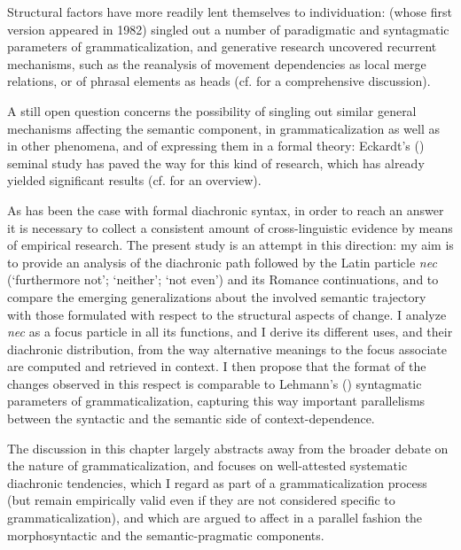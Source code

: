 \documentclass[output=paper,modfonts,nonflat,citecolor=brown,
showindex
]{langsci/langscibook}
\begin{document}
Structural factors have more readily lent themselves to individuation: \citet[]{Lehmann15} (whose first version appeared in 1982) singled out a number of paradigmatic and syntagmatic parameters of grammaticalization, and generative research uncovered recurrent mechanisms, such as the reanalysis of movement dependencies as local merge relations, or of phrasal elements as heads (cf. \citealt[]{RobertsRoussou03, Gelderen04a} for a comprehensive discussion). 

A still open question concerns the possibility of singling out similar general mechanisms affecting the semantic component, in grammaticalization as well as in other phenomena, and of expressing them in a formal theory: Eckardt's (\citeyear{Eckardt06}) seminal study has paved the way for this kind of research, which has already yielded significant results (cf. \citealt[]{Eckardt12, Deo15, Gianolloetal15} for an overview). 

As has been the case with formal diachronic syntax, in order to reach an answer it is necessary to collect a consistent amount of cross-linguistic evidence by means of empirical research. The present study is an attempt in this direction: my aim is to provide an analysis of the diachronic path followed by the Latin particle {\em{nec}} (`furthermore not'; `neither'; `not even') and its Romance continuations, and to compare the emerging generalizations about the involved semantic trajectory with those formulated with respect to the structural aspects of change. I analyze {\em{nec}} as a focus particle in all its functions, and I derive its different uses, and their diachronic distribution, from the way alternative meanings to the focus associate are computed and retrieved in context. I then propose that the format of the changes observed in this respect is comparable to Lehmann's (\citeyear[]{Lehmann15}) syntagmatic parameters of grammaticalization, capturing this way important parallelisms between the syntactic and the semantic side of context-dependence.  

The discussion in this chapter largely abstracts away from the broader debate on the nature of grammaticalization, and focuses on well-attested systematic diachronic tendencies, which I regard as part of a grammaticalization process (but remain empirically valid even if they are not considered specific to grammaticalization), and which are argued to affect in a parallel fashion the morphosyntactic and the semantic-pragmatic components.
\end{document}
